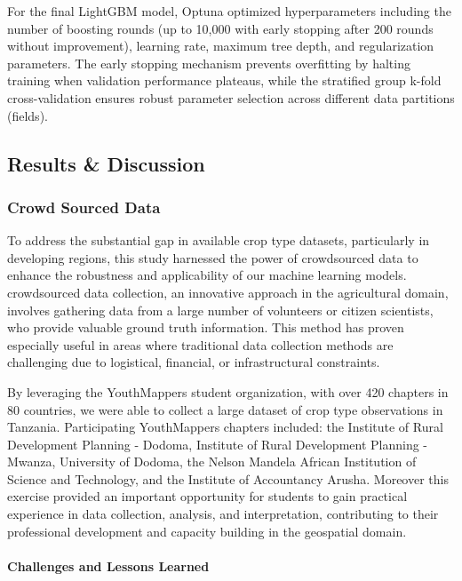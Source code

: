 \documentclass[
  journal,
  twocolumn]{IEEEtran}
\begin{document}
For the final LightGBM model, Optuna optimized hyperparameters including
the number of boosting rounds (up to 10,000 with early stopping after
200 rounds without improvement), learning rate, maximum tree depth, and
regularization parameters. The early stopping mechanism prevents
overfitting by halting training when validation performance plateaus,
while the stratified group k-fold cross-validation ensures robust
parameter selection across different data partitions (fields).

\hypertarget{results-discussion}{%
\subsection{Results \& Discussion}\label{results-discussion}}

\hypertarget{crowd-sourced-data}{%
\subsubsection{Crowd Sourced Data}\label{crowd-sourced-data}}

To address the substantial gap in available crop type datasets,
particularly in developing regions, this study harnessed the power of
crowdsourced data to enhance the robustness and applicability of our
machine learning models. crowdsourced data collection, an innovative
approach in the agricultural domain, involves gathering data from a
large number of volunteers or citizen scientists, who provide valuable
ground truth information. This method has proven especially useful in
areas where traditional data collection methods are challenging due to
logistical, financial, or infrastructural constraints.

By leveraging the YouthMappers student organization, with over 420
chapters in 80 countries, we were able to collect a large dataset of
crop type observations in Tanzania. Participating YouthMappers chapters
included: the Institute of Rural Development Planning - Dodoma,
Institute of Rural Development Planning - Mwanza, University of Dodoma,
the Nelson Mandela African Institution of Science and Technology, and
the Institute of Accountancy Arusha. Moreover this exercise provided an
important opportunity for students to gain practical experience in data
collection, analysis, and interpretation, contributing to their
professional development and capacity building in the geospatial domain.

\hypertarget{challenges-and-lessons-learned}{%
\paragraph{Challenges and Lessons
Learned}\label{challenges-and-lessons-learned}}
\end{document}
